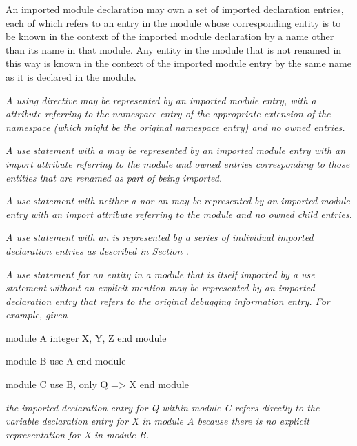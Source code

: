 An imported module declaration may own a set of imported
declaration entries, each of which refers to an entry in the
module whose corresponding entity is to be known in the context
of the imported module declaration by a name other than its
name in that module. Any entity in the module that is not
renamed in this way is known in the context of the imported
module entry by the same name as it is declared in the module.

\textit{A  using directive
may be represented by an imported 
module\hypertarget{chap:DWATimportnamespaceusingdirective}{}
entry, with a \DWATimportDEFN{} attribute referring to the namespace
entry of the appropriate extension of the namespace (which
might be the original namespace entry) and no owned entries.
}

\textit{A  use statement 
with a  may be
represented by an imported module entry with an import
attribute referring to the module and owned entries
corresponding to those entities that are renamed as part of
being imported.
}

\textit{A  use statement
with neither a  nor
an  may be represented by an imported module
entry with an import attribute referring to the module and
no owned child entries.
}

\textit{A use statement with an  is represented by a
series of individual imported declaration entries as described
in Section .
}

\textit{A  use statement for an entity in a module that is
itself imported by a use statement without an explicit mention
may be represented by an imported declaration entry that refers
to the original debugging information entry. For example, given}
\par %
\vspace{2mm}
\begin{nlnlisting}
module A
integer X, Y, Z
end module

module B
use A
end module

module C
use B, only Q => X
end module

\end{nlnlisting}
\textit{the imported declaration entry for Q within module C refers
directly to the variable declaration entry for X in module A
because there is no explicit representation for X in module B.
}

